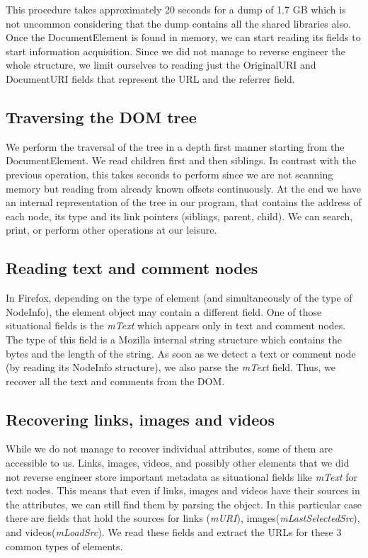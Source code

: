 This procedure takes approximately 20 seconds for a dump of 1.7 GB
which is not uncommon considering that the dump contains all the
shared libraries also. Once the DocumentElement is found in memory, we
can start reading its fields to start information acquisition. Since
we did not manage to reverse engineer the whole structure, we limit
ourselves to reading just the OriginalURI and DocumentURI fields that
represent the URL and the referrer field.

\subsection{Traversing the DOM tree}
We perform the traversal of the tree in a depth first manner starting
from the DocumentElement. We read children first and then siblings. In
contrast with the previous operation, this takes seconds to perform
since we are not scanning memory but reading from already known
offsets continuously. At the end we have an internal representation of
the tree in our program, that contains the address of each node, its
type and its link pointers (siblings, parent, child). We can search,
print, or perform other operations at our leisure.

\subsection{Reading text and comment nodes}
In Firefox, depending on the type of element (and simultaneously of
the type of NodeInfo), the element object may contain a different
field. One of those situational fields is the \textit{mText} which
appears only in text and comment nodes. The type of this field is a
Mozilla internal string structure which contains the bytes and the
length of the string. As soon as we detect a text or comment node (by
reading its NodeInfo structure), we also parse the \textit{mText}
field. Thus, we recover all the text and comments from the DOM.

\subsection{Recovering links, images and videos}
While we do not manage to recover individual attributes, some of them
are accessible to us. Links, images, videos, and possibly other
elements that we did not reverse engineer store important metadata as
situational fields like \textit{mText} for text nodes. This means that
even if links, images and videos have their sources in the attributes,
we can still find them by parsing the object. In this particular case
there are fields that hold the sources for links (\textit{mURI}),
images(\textit{mLastSelectedSrc}), and videos(\textit{mLoadSrc}). We
read these fields and extract the URLs for these 3 common types of
elements.

